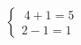 \documentclass[preview]{standalone}
\begin{document}
\begin{align*}
\left\{ \begin{array}{cl} \ 4 + 1= 5 \\[1pt] 2 - 1 = 1 \end{array} \right.
\end{align*}
\end{document}

